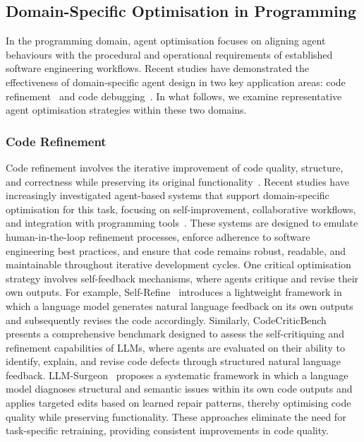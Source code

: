 \documentclass[]{selfevolagent}
\theoremstyle{plain}
\theoremstyle{definition}
\theoremstyle{remark}
\begin{document}
\subsection{Domain-Specific Optimisation in Programming}

In the programming domain, agent optimisation focuses on aligning agent behaviours with the procedural and operational requirements of established software engineering workflows. Recent studies have demonstrated the effectiveness of domain-specific agent design in two key application areas: code refinement~\citep{rasheed2024codepori,tang2024codeagent,pan2025codecor} and code debugging~\citep{lee2024unifieddebuggingapproachllmbased,puvvadi2025coding,adnan2025large}. In what follows, we examine representative agent optimisation strategies within these two domains.

\subsubsection{Code Refinement}

Code refinement involves the iterative improvement of code quality, structure, and correctness while preserving its original functionality~\citep{yang2024enhancing,he2025llm,islam2025codesim}. Recent studies have increasingly investigated agent-based systems that support domain-specific optimisation for this task, focusing on self-improvement, collaborative workflows, and integration with programming tools~\citep{madaan2023self,tang2024codeagent,rahman2025marco}. These systems are designed to emulate human-in-the-loop refinement processes, enforce adherence to software engineering best practices, and ensure that code remains robust, readable, and maintainable throughout iterative development cycles. One critical optimisation strategy involves self-feedback mechanisms, where agents critique and revise their own outputs. For example, Self-Refine~\citep{madaan2023self} introduces a lightweight framework in which a language model generates natural language feedback on its own outputs and subsequently revises the code accordingly. Similarly, CodeCriticBench~\citep{zhang2025codecriticbench} presents a comprehensive benchmark designed to assess the self-critiquing and refinement capabilities of LLMs, where agents are evaluated on their ability to identify, explain, and revise code defects through structured natural language feedback. LLM-Surgeon~\citep{van2023llm} proposes a systematic framework in which a language model diagnoses structural and semantic issues within its own code outputs and applies targeted edits based on learned repair patterns, thereby optimising code quality while preserving functionality. These approaches eliminate the need for task-specific retraining, providing consistent improvements in code quality.
\end{document}
